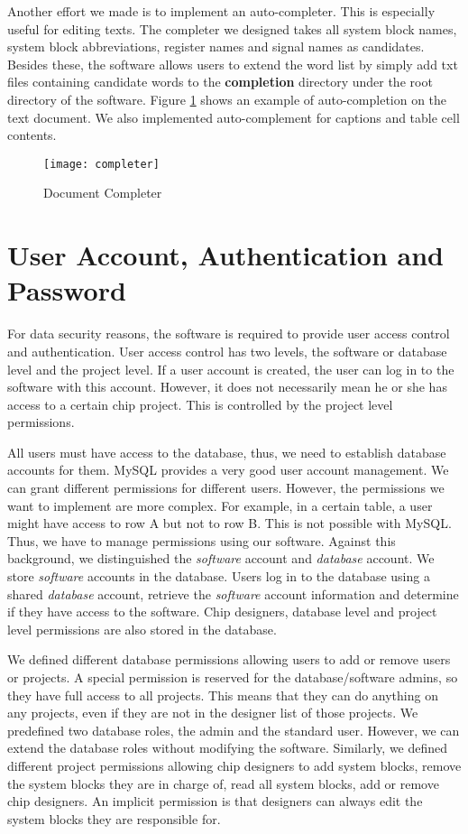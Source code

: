 Another effort we made is to implement an auto-completer. This is especially useful for editing texts. The completer we designed takes all system block names, system block abbreviations, register names and signal names as candidates. Besides these, the software allows users to extend the word list by simply add txt files containing candidate words to the \textbf{completion} directory under the root directory of the software. Figure \ref{fig:Document Completer} shows an example of auto-completion on the text document. We also implemented auto-complement for captions and table cell contents. 

\begin{figure}[htb]
\centering
\texttt{[image: completer]}
\caption{Document Completer\label{fig:Document Completer}}
\end{figure} 

\section{User Account, Authentication and Password}
For data security reasons, the software is required to provide user access control and authentication. User access control has two levels, the software or database level and the project level. If a user account is created, the user can log in to the software with this account. However, it does not necessarily mean he or she has access to a certain chip project. This is controlled by the project level permissions.

All users must have access to the database, thus, we need to establish database accounts for them. MySQL provides a very good user account management. We can grant different permissions for different users. However, the permissions we want to implement are more complex. For example, in a certain table, a user might have access to row A but not to row B. This is not possible with MySQL. Thus, we have to manage permissions using our software. Against this background, we distinguished the \textit{software} account and \textit{database} account. We store \textit{software} accounts in the database. Users log in to the database using a shared \textit{database} account, retrieve the \textit{software} account information and determine if they have access to the software. Chip designers, database level and project level permissions are also stored in the database.

We defined different database permissions allowing users to add or remove users or projects. A special permission is reserved for the database/software admins, so they have full access to all projects. This means that they can do anything on any projects, even if they are not in the designer list of those projects. We predefined two database roles, the admin and the standard user. However, we can extend the database roles without modifying the software. Similarly, we defined different project permissions allowing chip designers to add system blocks, remove the system blocks they are in charge of, read all system blocks, add or remove chip designers. An implicit permission is that designers can always edit the system blocks they are responsible for.

